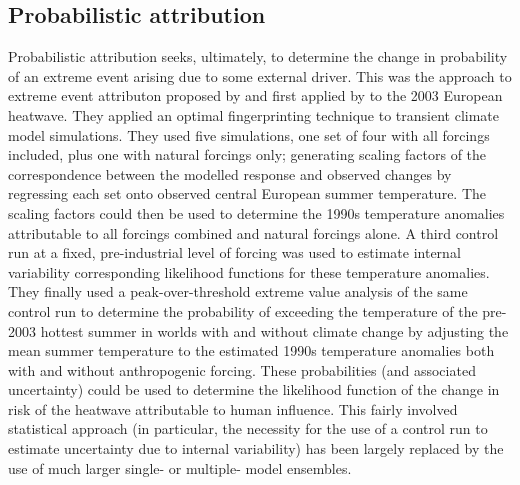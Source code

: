   \subsection{Probabilistic attribution}

    Probabilistic attribution seeks, ultimately, to determine the change in probability of an extreme event arising due to some external driver. This was the approach to extreme event attributon proposed by \citet{allen_liability_2003} and first applied by \citet{stott_human_2004} to the 2003 European heatwave. They applied an optimal fingerprinting technique \citep{hasselmann_optimal_1993,hasselmann_multi-pattern_1997} to transient climate model simulations. They used five simulations, one set of four with all forcings included, plus one with natural forcings only; generating scaling factors of the correspondence between the modelled response and observed changes by regressing each set onto observed central European summer temperature. The scaling factors could then be used to determine the 1990s temperature anomalies attributable to all forcings combined and natural forcings alone. A third control run at a fixed, pre-industrial level of forcing was used to estimate internal variability corresponding likelihood functions for these temperature anomalies. They finally used a peak-over-threshold extreme value analysis of the same control run to determine the probability of exceeding the temperature of the pre-2003 hottest summer in worlds with and without climate change by adjusting the mean summer temperature to the estimated 1990s temperature anomalies both with and without anthropogenic forcing. These probabilities (and associated uncertainty) could be used to determine the likelihood function of the change in risk of the heatwave attributable to human influence. This fairly involved statistical approach (in particular, the necessity for the use of a control run to estimate uncertainty due to internal variability) has been largely replaced by the use of much larger single- or multiple- model ensembles.

